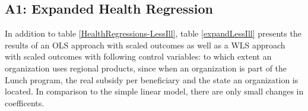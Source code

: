 \documentclass[12pt, a4paper, titlepage]{article}\usepackage[]{graphicx}\usepackage[]{color}
\begin{document}
\subsection{A1: Expanded Health Regression}

In addition to table \ref{HealthRegressions-LessIll}, table \ref{expandLessIll} presents the results of an OLS approach with scaled outcomes as well as a WLS approach with scaled outcomes with following control variables: to which extent an organization uses regional products, since when an organization is part of the Lunch program, the real subsidy per beneficiary and the state an organization is located. In comparison to the simple linear model, there are only small changes in coefficents. 

% 
\end{document}
